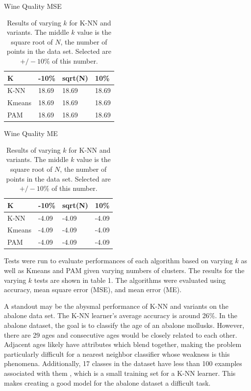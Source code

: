 \documentclass[twoside,11pt]{article}
\begin{document}
\begin{table}[h]
	\centering
	\begin{minipage}[b]{0.45\linewidth}\centering
		Wine Quality MSE
		\begin{tabular}{llll}
			\hline
			K      & -10\% & sqrt(N) & 10\%  \\ \hline
			K-NN   & 18.69 & 18.69   & 18.69 \\
			Kmeans & 18.69 & 18.69   & 18.69 \\
			PAM    & 18.69 & 18.69   & 18.69
		\end{tabular}
	\end{minipage}
	\hspace{0.5cm}\centering
	\centering
	\begin{minipage}[b]{0.45\linewidth}
		Wine Quality ME
		\centering
		\begin{tabular}{llll}
			\hline
			K      & -10\% & sqrt(N) & 10\%  \\ \hline
			K-NN   & -4.09 & -4.09   & -4.09 \\
			Kmeans & -4.09 & -4.09   & -4.09 \\
			PAM    & -4.09 & -4.09   & -4.09
		\end{tabular}
	\end{minipage}
	\caption{Results of varying $k$ for K-NN and variants. The middle $k$ value is the square root of $N$, the number of points in the data set. Selected are $+/- 10\%$ of this number.}
\end{table}

Tests were run to evaluate performances of each algorithm based on varying $k$ as well as Kmeans and PAM given varying numbers of clusters. The results for the varying $k$ tests are shown in table 1. The algorithms were evaluated using accuracy, mean square error (MSE), and mean error (ME).

A standout may be the abysmal performance of K-NN and variants on the abalone data set. The K-NN learner's average accuracy is around 26\%. In the abalone dataset, the goal is to classify the age of an abalone mollusks. However, there are 29 ages and consecutive ages would be closely related to each other. Adjacent ages likely have attributes which blend together, making the problem particularly difficult for a nearest neighbor classifier whose weakness is this phenomena. 
Additionally, 17 classes in the dataset have less than 100 examples associated with them \citep{datasets}, which is a small training set for a K-NN learner.
This makes creating a good model for the abalone dataset a difficult task.
\end{document}
